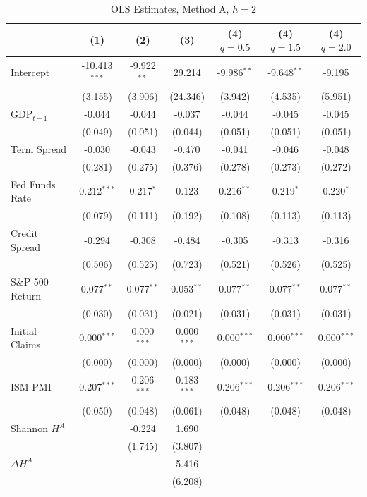 \begin{table}[htbp]
\centering
\caption{OLS Estimates, Method A, $h = 2$}
\label{tab:ols_coef_A_h2}
\footnotesize
\begin{tabular}{lcccccc}
\toprule
 & (1) & (2) & (3) & (4) $q\!=\!0.5$ & (4) $q\!=\!1.5$ & (4) $q\!=\!2.0$ \\
\midrule
  Intercept & -10.413$^{***}$ & -9.922$^{**}$ & 29.214 & -9.986$^{**}$ & -9.648$^{**}$ & -9.195 \\
  & (3.155) & (3.906) & (24.346) & (3.942) & (4.535) & (5.951) \\[2pt]
  GDP$_{t-1}$ & -0.044 & -0.044 & -0.037 & -0.044 & -0.045 & -0.045 \\
  & (0.049) & (0.051) & (0.044) & (0.051) & (0.051) & (0.051) \\[2pt]
  Term Spread & -0.030 & -0.043 & -0.470 & -0.041 & -0.046 & -0.048 \\
  & (0.281) & (0.275) & (0.376) & (0.278) & (0.273) & (0.272) \\[2pt]
  Fed Funds Rate & 0.212$^{***}$ & 0.217$^{*}$ & 0.123 & 0.216$^{**}$ & 0.219$^{*}$ & 0.220$^{*}$ \\
  & (0.079) & (0.111) & (0.192) & (0.108) & (0.113) & (0.113) \\[2pt]
  Credit Spread & -0.294 & -0.308 & -0.484 & -0.305 & -0.313 & -0.316 \\
  & (0.506) & (0.525) & (0.723) & (0.521) & (0.526) & (0.525) \\[2pt]
  S\&P 500 Return & 0.077$^{**}$ & 0.077$^{**}$ & 0.053$^{**}$ & 0.077$^{**}$ & 0.077$^{**}$ & 0.077$^{**}$ \\
  & (0.030) & (0.031) & (0.021) & (0.031) & (0.031) & (0.031) \\[2pt]
  Initial Claims & 0.000$^{***}$ & 0.000$^{***}$ & 0.000$^{***}$ & 0.000$^{***}$ & 0.000$^{***}$ & 0.000$^{***}$ \\
  & (0.000) & (0.000) & (0.000) & (0.000) & (0.000) & (0.000) \\[2pt]
  ISM PMI & 0.207$^{***}$ & 0.206$^{***}$ & 0.183$^{***}$ & 0.206$^{***}$ & 0.206$^{***}$ & 0.206$^{***}$ \\
  & (0.050) & (0.048) & (0.061) & (0.048) & (0.048) & (0.048) \\[2pt]
  Shannon $H^A$ &  & -0.224 & 1.690 &  &  &  \\
  &  & (1.745) & (3.807) &  &  &  \\[2pt]
  $\Delta H^A$ &  &  & 5.416 &  &  &  \\
  &  &  & (6.208) &  &  &  \\[2pt]

\end{tabular}
\end{table}
